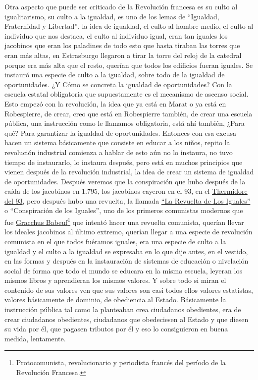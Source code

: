 Otra aspecto que puede ser criticado de la Revolución francesa es su culto al igualitarismo, su culto a la igualdad, es uno de los lemas de \enquote{Igualdad, Fraternidad y Libertad}, la idea de igualdad, el culto al hombre medio, el culto al individuo que nos destaca, el culto al individuo igual, eran tan iguales los jacobinos que eran los paladines de todo esto que hasta tiraban las torres que eran más altas, en Estrasburgo llegaron a tirar la torre del reloj de la catedral porque era más alta que el resto, querían que todos los edificios fueran iguales. Se instauró una especie de culto a la igualdad, sobre todo de la igualdad de oportunidades. ¿Y Cómo se concreta la igualdad de oportunidades? Con la escuela estatal obligatoria que supuestamente es el mecanismo de ascenso social. Esto empezó con la revolución, la idea que ya está en Marat o ya está en Robespierre, de crear, creo que está en Robespierre también, de crear una escuela pública, una instrucción como le llamamos obligatoria, está ahí también, ¿Para qué? Para garantizar la igualdad de oportunidades. Entonces con esa excusa hacen un sistema básicamente que consiste en educar a los niños, repito la revolución industrial comienza a hablar de esto aún no lo instaura, no tuvo tiempo de instaurarlo, lo instaura después, pero está en muchos principios que vienen después de la revolución industrial, la idea de crear un sistema de igualdad de oportunidades. Después veremos que la conspiración que hubo después de la caída de los jacobinos en 1.795, los jacobinos cayeron en el 93, en el \href{https://en.wikipedia.org/wiki/Thermidorian_Reaction}{Thermidore del 93}, pero después hubo una revuelta, la llamada \href{https://en.wikipedia.org/wiki/Conspiracy_of_the_Equals}{\enquote{La Revuelta de Los Iguales}} o \enquote{Conspiración de los Iguales}, uno de los primeros comunistas modernos que fue \href{https://en.wikipedia.org/wiki/Fran%C3%A7ois-No%C3%ABl_Babeuf}{Gracchus Babeuf}\footnote{Protocomunista, revolucionario y periodista francés del período de la Revolución Francesa.} que intentó hacer una revuelta comunista, querían llevar los ideales jacobinos al último extremo, querían llegar a una especie de revolución comunista en el que todos fuéramos iguales, era una especie de culto a la igualdad y el culto a la igualdad
se expresaba en lo que dije antes, en el vestido, en las formas y después en la instauración de sistemas de educación o nivelación social de forma que todo el mundo se educara en la misma escuela, leyeran los mismos libros y aprendieran los mismos valores. Y sobre todo si miran el contenido de sus valores ven que sus valores son casi todos ellos valores estatistas, valores básicamente de dominio, de obediencia al Estado. Básicamente la instrucción pública tal como la planteaban crea ciudadanos obedientes, era de crear ciudadanos obedientes, ciudadanos que obedeciesen al Estado y que diesen su vida por él, que pagasen tributos por él y eso lo consiguieron en buena medida, lentamente.

